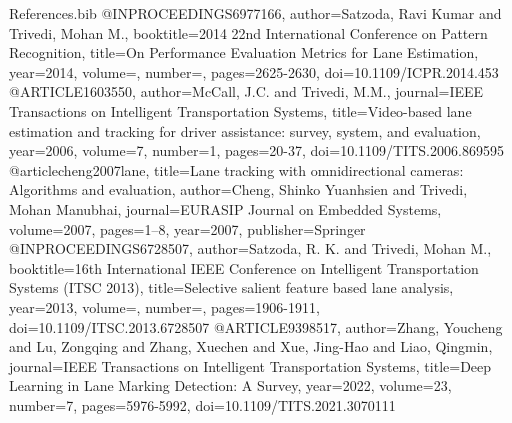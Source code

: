 \documentclass[a4paper,12pt,sort&compress]{article}
\begin{document}
\begin{filecontents}{References.bib}
    @INPROCEEDINGS{6977166,
        author={Satzoda, Ravi Kumar and Trivedi, Mohan M.},
        booktitle={2014 22nd International Conference on Pattern Recognition}, 
        title={On Performance Evaluation Metrics for Lane Estimation}, 
        year={2014},
        volume={},
        number={},
        pages={2625-2630},
        doi={10.1109/ICPR.2014.453}
    }
    @ARTICLE{1603550,
        author={McCall, J.C. and Trivedi, M.M.},
        journal={IEEE Transactions on Intelligent Transportation Systems}, 
        title={Video-based lane estimation and tracking for driver assistance: survey, system, and evaluation}, 
        year={2006},
        volume={7},
        number={1},
        pages={20-37},
        doi={10.1109/TITS.2006.869595}
    }
    @article{cheng2007lane,
        title={Lane tracking with omnidirectional cameras: Algorithms and evaluation},
        author={Cheng, Shinko Yuanhsien and Trivedi, Mohan Manubhai},
        journal={EURASIP Journal on Embedded Systems},
        volume={2007},
        pages={1--8},
        year={2007},
        publisher={Springer}
    }
    @INPROCEEDINGS{6728507,
        author={Satzoda, R. K. and Trivedi, Mohan M.},
        booktitle={16th International IEEE Conference on Intelligent Transportation Systems (ITSC 2013)}, 
        title={Selective salient feature based lane analysis}, 
        year={2013},
        volume={},
        number={},
        pages={1906-1911},
        doi={10.1109/ITSC.2013.6728507}}
    @ARTICLE{9398517,
        author={Zhang, Youcheng and Lu, Zongqing and Zhang, Xuechen and Xue, Jing-Hao and Liao, Qingmin},
        journal={IEEE Transactions on Intelligent Transportation Systems}, 
        title={Deep Learning in Lane Marking Detection: A Survey}, 
        year={2022},
        volume={23},
        number={7},
        pages={5976-5992},
        doi={10.1109/TITS.2021.3070111}}


\end{filecontents}
\end{document}
